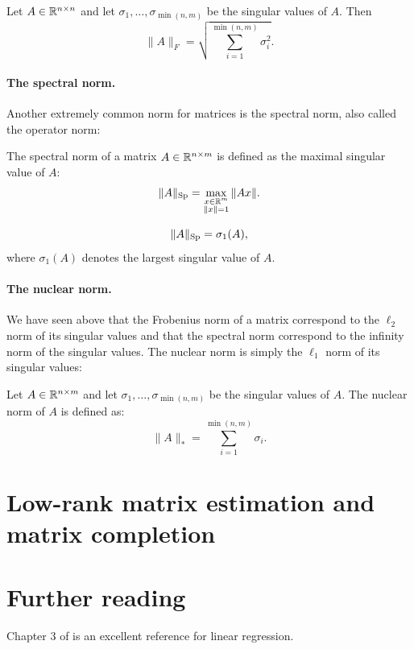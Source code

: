 \documentclass[11pt,nocut]{article}
\begin{document}
\begin{proposition}
	Let $A \in \mathbb{R}^{n \times n}$ and let $\sigma_1, \dots, \sigma_{\min(n,m)}$ be the singular values of $A$. Then
	$$
	\|A\|_F = \sqrt{\sum_{i=1}^{\min(n,m)} \sigma_i^2}.
	$$
\end{proposition}


\paragraph{The spectral norm.} Another extremely common norm for matrices is the spectral norm, also called the operator norm:

\begin{definition}
	The spectral norm of a matrix $A \in \mathbb{R}^{n \times m}$ is defined as the maximal singular value of $A$:
	$$
	\|A\|_{\rm Sp} = \max_{\substack{x \in \mathbb{R}^m \\ \|x\|=1}} \|Ax\|.
	$$
\end{definition}
\begin{proposition}
	$$
	\|A\|_{\rm Sp} = \sigma_1(A),
	$$
	where $\sigma_1(A)$ denotes the largest singular value of $A$.
\end{proposition}

\paragraph{The nuclear norm.} We have seen above that the Frobenius norm of a matrix correspond to the $\ell_2$ norm of its singular values and that the spectral norm correspond to the infinity norm of the singular values. The nuclear norm is simply the $\ell_1$ norm of its singular values:
\begin{definition}
	Let $A \in \mathbb{R}^{n \times m}$ and let $\sigma_1, \dots, \sigma_{\min(n,m)}$ be the singular values of $A$. The nuclear norm of $A$ is defined as:
	$$
	\|A\|_* = \sum_{i=1}^{\min(n,m)} \sigma_i.
	$$
	
\end{definition}

\section{Low-rank matrix estimation and matrix completion}



\section*{Further reading}

Chapter 3 of \cite{friedman2001elements} is an excellent reference for linear regression.

\vspace{1cm}
\centerline{}




\end{document}
